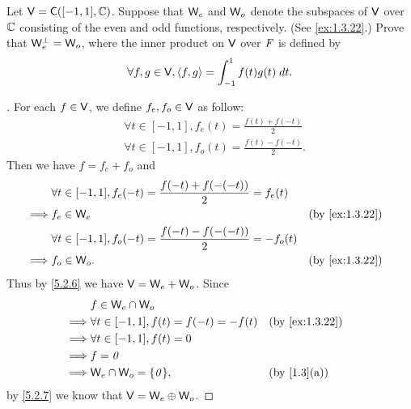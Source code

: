 \begin{ex}\label{ex:6.2.18}
  Let \(\V = \cfs([-1, 1], \C)\).
  Suppose that \(\mathsf{W}_e\) and \(\mathsf{W}_o\) denote the subspaces of \(\mathsf{V}\) over \(\mathbb{C}\) consisting of the even and odd functions, respectively.
  (See \cref{ex:1.3.22}.)
  Prove that \(\mathsf{W}_e^{\perp} = \mathsf{W}_o\), where the inner product on \(\mathsf{V}\) over \(\mathit{F}\) is defined by
  \[
    \forall f, g \in \mathsf{V}, \left\langle f, g\right\rangle = \int_{-1}^1 f(t) g(t) \; dt.
  \]
\end{ex}

\begin{proof}[]
  For each \(f \in \mathsf{V}\), we define \(f_e, f_o \in \mathsf{V}\) as follow:
  \begin{align*}
     & \forall t \in [-1, 1], f_e(t) = \frac{f(t) + f(-t)}{2}  \\
     & \forall t \in [-1, 1], f_o(t) = \frac{f(t) - f(-t)}{2}.
  \end{align*}
  Then we have \(f = f_e + f_o\) and
  \begin{align*}
             & \forall t \in [-1, 1], f_e(-t) = \frac{f(-t) + f(-(-t))}{2} = f_e(t)                      \\
    \implies & f_e \in \W_e                                                          &  & \by{ex:1.3.22} \\
             & \forall t \in [-1, 1], f_o(-t) = \frac{f(-t) - f(-(-t))}{2} = -f_o(t)                     \\
    \implies & f_o \in \W_o.                                                         &  & \by{ex:1.3.22}
  \end{align*}
  Thus by \cref{5.2.6} we have \(\mathsf{V} = \mathsf{W}_e + \mathsf{W}_o\).
  Since
  \begin{align*}
             & f \in \W_e \cap \W_o                                            \\
    \implies & \forall t \in [-1, 1], f(t) = f(-t) = -f(t) &  & \by{ex:1.3.22} \\
    \implies & \forall t \in [-1, 1], f(t) = 0                                 \\
    \implies & f = \zv                                                         \\
    \implies & \W_e \cap \W_o = \set{\zv},                 &  & \by{1.3}[a]
  \end{align*}
  by \cref{5.2.7} we know that \(\mathsf{V} = \mathsf{W}_e \oplus \mathsf{W}_o\).


\end{proof}
